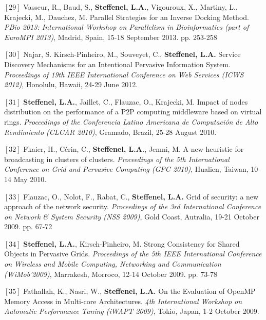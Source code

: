 \documentclass[final,twoside]{hdr} %
\begin{document}
\vspace{1em} \noindent $[29]$
Vasseur, R., Baud, S., {\bf Steffenel, L.A.}, Vigouroux, X., Martiny, L., Krajecki, M., Dauchez, M. {Parallel Strategies for an Inverse Docking Method}. {\em PBio 2013: International Workshop on Parallelism in Bioinformatics (part of EuroMPI 2013)}, Madrid, Spain, 15-18 September 2013. pp. 253-258

\vspace{1em} \noindent $[30]$
Najar, S. Kirsch-Pinheiro, M., Souveyet, C., {\bf Steffenel, L.A.} {Service Discovery Mechanisms for an Intentional Pervasive Information System}. {\em Proceedings of 19th IEEE International Conference on Web Services (ICWS 2012)}, Honolulu, Hawaii, 24-29 June 2012. 

\vspace{1em} \noindent $[31]$
{\bf Steffenel, L.A.}, Jaillet, C., Flauzac, O., Krajecki, M. {Impact of nodes distribution on the performance of a P2P computing middleware based on virtual rings}. {\em Proceedings of the Conferencia Latino Americana de Computación de Alto Rendimiento (CLCAR 2010)}, Gramado, Brazil, 25-28 August 2010.

\vspace{1em} \noindent $[32]$
Fkaier, H., Cérin, C., {\bf Steffenel, L.A.}, Jemni, M. {A new heuristic for broadcasting in clusters of clusters}. {\em Proceedings of the 5th International Conference on Grid and Pervasive Computing (GPC 2010)}, Hualien, Taiwan, 10-14 May 2010.

\vspace{1em} \noindent $[33]$
Flauzac, O., Nolot, F., Rabat, C., {\bf Steffenel, L.A.} {Grid of security: a new approach of the network security}. {\em Proceedings of the 3rd International Conference on Network \& System Security (NSS 2009)}, Gold Coast, Autralia, 19-21 October 2009. pp. 67-72

\vspace{1em} \noindent $[34]$
{\bf Steffenel, L.A.}, Kirsch-Pinheiro, M. {Strong Consistency for Shared Objects in Pervasive Grids}. {\em Proceedings of the 5th IEEE International Conference on Wireless and Mobile Computing, Networking and Communication (WiMob'2009)}, Marrakesh, Morroco, 12-14 October 2009. pp. 73-78 

\vspace{1em} \noindent $[35]$
Fathallah, K., Nasri, W., {\bf Steffenel, L.A.} {On the Evaluation of OpenMP Memory Access in Multi-core Architectures}. {\em 4th International Workshop on Automatic Performance Tuning (iWAPT 2009)}, Tokio, Japan, 1-2 October 2009. 
\end{document}

